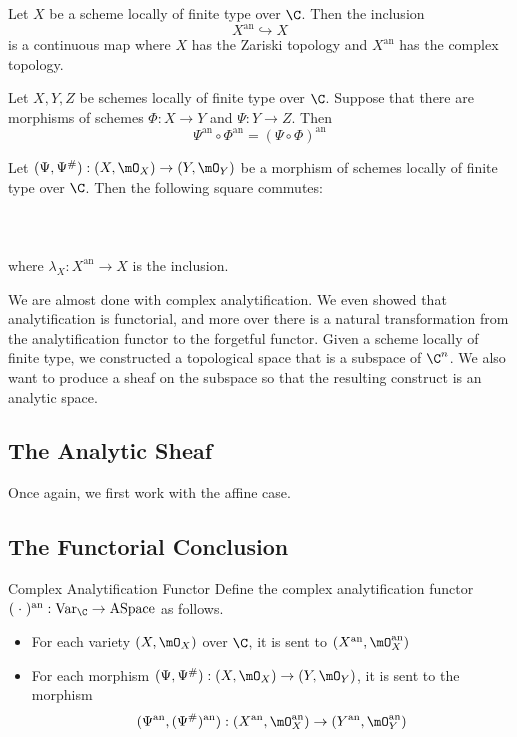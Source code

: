 \documentclass[a4paper]{article}
\begin{document}
\begin{lmm}{}{} Let $X$ be a scheme locally of finite type over $\C$. Then the inclusion $$X^\text{an}\hookrightarrow X$$ is a continuous map where $X$ has the Zariski topology and $X^\text{an}$ has the complex topology. 
\end{lmm}

\begin{crl}{}{} Let $X,Y,Z$ be schemes locally of finite type over $\C$. Suppose that there are morphisms of schemes $\Phi:X\to Y$ and $\Psi:Y\to Z$. Then $$\Psi^\text{an}\circ\Phi^\text{an}=(\Psi\circ\Phi)^\text{an}$$
\end{crl}

\begin{crl}{}{} Let $(\Psi,\Psi^\#):(X,\mO_X)\to(Y,\mO_Y)$ be a morphism of schemes locally of finite type over $\C$. Then the following square commutes: \\~\\
\\~\\
where $\lambda_X:X^\text{an}\to X$ is the inclusion. 
\end{crl}

We are almost done with complex analytification. We even showed that analytification is functorial, and more over there is a natural transformation from the analytification functor to the forgetful functor. Given a scheme locally of finite type, we constructed a topological space that is a subspace of $\C^n$. We also want to produce a sheaf on the subspace so that the resulting construct is an analytic space. 

\subsection{The Analytic Sheaf}
Once again, we first work with the affine case. 

\subsection{The Functorial Conclusion}
\begin{defn}{Complex Analytification Functor}{} Define the complex analytification functor $(\;\cdot\;)^\text{an}:\text{Var}_\C\to\text{ASpace}$ as follows. 
\begin{itemize}
\item For each variety $(X,\mO_X)$ over $\C$, it is sent to $(X^\text{an},\mO_X^\text{an})$
\item For each morphism $(\Psi,\Psi^\#):(X,\mO_X)\to(Y,\mO_Y)$, it is sent to the morphism $$(\Psi^\text{an},(\Psi^\#)^\text{an}):(X^\text{an},\mO_X^\text{an})\to(Y^\text{an},\mO_Y^\text{an})$$
\end{itemize}
\end{defn}
\end{document}
